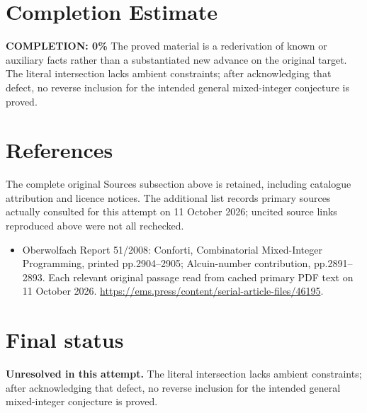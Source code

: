 \documentclass[11pt]{article}
\begin{document}
\section{Completion Estimate}
\noindent\textbf{COMPLETION: 0\%}
The proved material is a rederivation of known or auxiliary facts rather than a substantiated new advance on the original target. The literal intersection lacks ambient constraints; after acknowledging that defect, no reverse inclusion for the intended general mixed-integer conjecture is proved.
\section{References}
The complete original Sources subsection above is retained, including catalogue attribution and licence notices. The additional list records primary sources actually consulted for this attempt on 11 October 2026; uncited source links reproduced above were not all rechecked.
\begin{itemize}
\item Oberwolfach Report 51/2008: Conforti, Combinatorial Mixed-Integer Programming, printed pp.2904--2905; Alcuin-number contribution, pp.2891--2893. Each relevant original passage read from cached primary PDF text on 11 October 2026. \url{https://ems.press/content/serial-article-files/46195}.
\end{itemize}
\section{Final status}
\textbf{Unresolved in this attempt.} The literal intersection lacks ambient constraints; after acknowledging that defect, no reverse inclusion for the intended general mixed-integer conjecture is proved.
\end{document}
